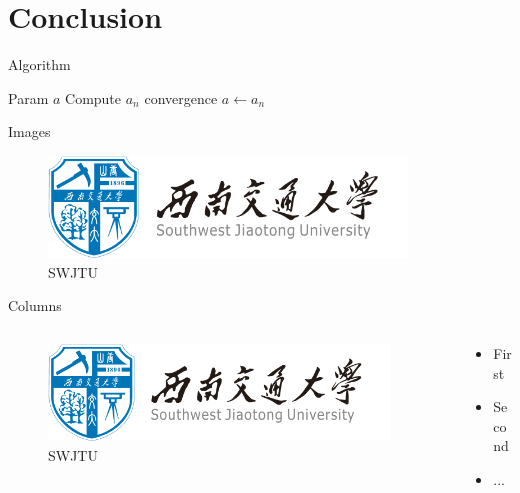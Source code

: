 \documentclass[11pt,utf8]{SWJTUBeamer}
\begin{document}
\section{Conclusion}

\begin{frame}{Algorithm}
    \begin{algorithm2e}[H]
        \caption{Algorithm 1}\label{alg:em}
        \begin{algorithmic}[1]
            \REQUIRE Param
            \ENSURE $a$
            \REPEAT
            \STATE Compute $a_n$
            \UNTIL convergence
            \RETURN $a\leftarrow a_n$
        \end{algorithmic}
    \end{algorithm2e}
\end{frame}

\begin{frame}{Images}
    \begin{figure}
        \centering
        \includegraphics[width=0.85\textwidth]{swjtu_logo.png}
        \caption{SWJTU}\label{fig:jtu}
    \end{figure}
\end{frame}

\begin{frame}{Columns}
    \begin{columns}
        \begin{column}{0.45\textwidth}
            \begin{figure}
                \centering
                \includegraphics[width=0.95\textwidth]{swjtu_logo.png}
                \caption{SWJTU}\label{fig:SWJTU}
            \end{figure}
        \end{column}
        \begin{column}{0.55\textwidth}
            \begin{itemize}
                \item First
                \item Second
                \item ...
            \end{itemize}
        \end{column}
    \end{columns}
\end{frame}
\end{document}
